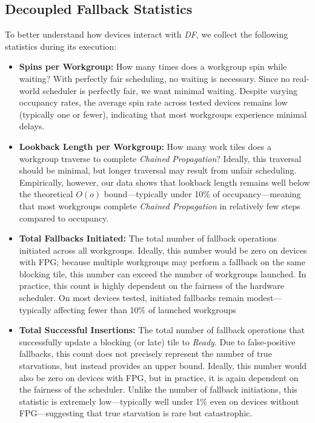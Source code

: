 \documentclass[sigconf,screen]{acmart}
\begin{document}
\subsection{Decoupled Fallback Statistics}
To better understand how devices interact with \emph{DF}, we collect the following statistics during its execution:
\begin{itemize}
  \item \textbf{Spins per Workgroup:} How many times does a workgroup spin while waiting? With perfectly fair scheduling, no waiting is necessary. Since no real-world scheduler is perfectly fair, we want minimal waiting. Despite varying occupancy rates, the average spin rate across tested devices remains low (typically one or fewer), indicating that most workgroups experience minimal delays.

  \item \textbf{Lookback Length per Workgroup:} How many work tiles does a workgroup traverse to complete \emph{Chained Propagation}? Ideally, this traversal should be minimal, but longer traversal may result from unfair scheduling. Empirically, however, our data shows that lookback length remains well below the theoretical $O(o)$ bound---typically under 10\% of occupancy---meaning that most workgroups complete \emph{Chained Propagation} in relatively few steps compared to occupancy.

  \item \textbf{Total Fallbacks Initiated:} The total number of fallback operations initiated across all workgroups. Ideally, this number would be zero on devices with FPG\@; because multiple workgroups may perform a fallback on the same blocking tile, this number can exceed the number of workgroups launched. In practice, this count is highly dependent on the fairness of the hardware scheduler. On most devices tested, initiated fallbacks remain modest---typically affecting fewer than 10\% of launched workgroups

  \item \textbf{Total Successful Insertions:} The total number of fallback operations that successfully update a blocking (or late) tile to \emph{Ready}. Due to false-positive fallbacks, this count does not precisely represent the number of true starvations, but instead provides an upper bound. Ideally, this number would also be zero on devices with FPG, but in practice, it is again dependent on the fairness of the scheduler. Unlike the number of fallback initiations, this statistic is extremely low---typically well under 1\% even on devices without FPG---suggesting that true starvation is rare but catastrophic.
\end{itemize}
\end{document}
